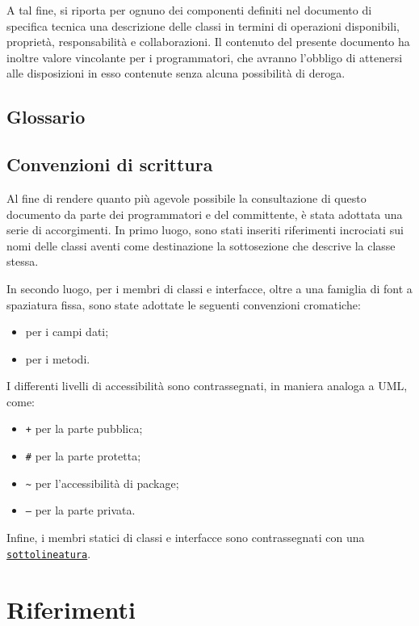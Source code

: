 A tal fine, si riporta per ognuno dei componenti definiti nel documento di specifica tecnica una descrizione delle classi in termini di operazioni disponibili, proprietà, responsabilità e collaborazioni. Il contenuto del presente documento ha inoltre valore vincolante per i programmatori, che avranno l'obbligo di attenersi alle disposizioni in esso contenute senza alcuna possibilità di deroga.

\subsection{Glossario}
\glossaryIntro

\subsection{Convenzioni di scrittura}
Al fine di rendere quanto più agevole possibile la consultazione di questo documento da parte dei programmatori e del committente, è stata adottata una serie di accorgimenti. In primo luogo, sono stati inseriti riferimenti incrociati sui nomi delle classi aventi come destinazione la sottosezione che descrive la classe stessa.

In secondo luogo, per i membri di classi e interfacce, oltre a una famiglia di font a spaziatura fissa, sono state adottate le seguenti convenzioni cromatiche:
\begin{itemize}[noitemsep,nolistsep]
  \item {} per i campi dati;
  \item {} per i metodi.
\end{itemize}

I differenti livelli di accessibilità sono contrassegnati, in maniera analoga a UML, come:
\begin{itemize}
  \item \texttt{\ttfamily +} per la parte pubblica;
  \item \texttt{\ttfamily \#} per la parte protetta;
  \item \texttt{\ttfamily \textasciitilde} per  l'accessibilità di package;
  \item \texttt{\ttfamily --} per la parte privata.
\end{itemize}

Infine, i membri statici di classi e interfacce sono contrassegnati con una \underline{\texttt{sottolineatura}}.
\clearpage

\section{Riferimenti}

